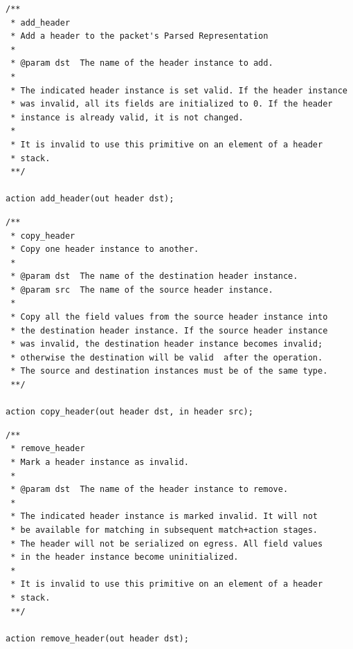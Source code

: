 \documentclass[12pt]{article}
\begin{document}
\begin{lstlisting}[style=P4style]
/**
 * add_header
 * Add a header to the packet's Parsed Representation
 *
 * @param dst  The name of the header instance to add.
 * 
 * The indicated header instance is set valid. If the header instance
 * was invalid, all its fields are initialized to 0. If the header
 * instance is already valid, it is not changed.
 *
 * It is invalid to use this primitive on an element of a header
 * stack.
 **/

action add_header(out header dst);

\end{lstlisting}


\begin{lstlisting}[style=P4style]
/**
 * copy_header
 * Copy one header instance to another.
 * 
 * @param dst  The name of the destination header instance.
 * @param src  The name of the source header instance.
 * 
 * Copy all the field values from the source header instance into
 * the destination header instance. If the source header instance
 * was invalid, the destination header instance becomes invalid;
 * otherwise the destination will be valid  after the operation.
 * The source and destination instances must be of the same type.
 **/

action copy_header(out header dst, in header src);

\end{lstlisting}


\begin{lstlisting}[style=P4style]
/**
 * remove_header
 * Mark a header instance as invalid.
 * 
 * @param dst  The name of the header instance to remove.
 * 
 * The indicated header instance is marked invalid. It will not
 * be available for matching in subsequent match+action stages.
 * The header will not be serialized on egress. All field values
 * in the header instance become uninitialized.
 * 
 * It is invalid to use this primitive on an element of a header
 * stack.
 **/

action remove_header(out header dst);

\end{lstlisting}
\end{document}
